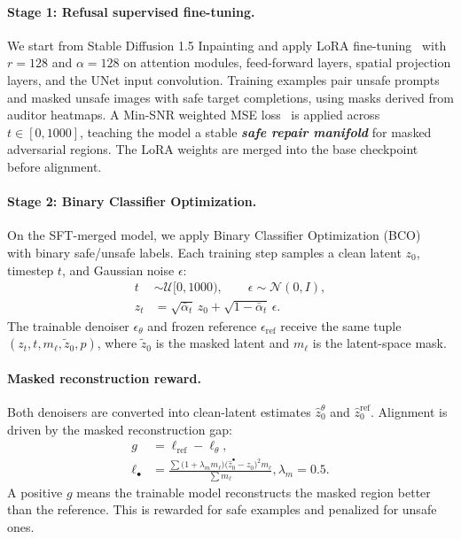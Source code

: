 \documentclass[11pt]{article}
\begin{document}
\paragraph{Stage 1: Refusal supervised fine-tuning.}
We start from Stable Diffusion 1.5 Inpainting and apply LoRA
fine-tuning~\cite{hu2022lora} with $r=128$ and $\alpha=128$ on attention
modules, feed-forward layers, spatial projection layers, and the UNet input
convolution. Training examples pair unsafe prompts and masked unsafe images
with safe target completions, using masks derived from auditor heatmaps. A
Min-SNR weighted MSE loss~\cite{hang2023minsnr} is applied across
$t\in[0,1000]$, teaching the model a stable \textbf{\emph{safe repair
manifold}} for masked adversarial regions. The LoRA weights are merged into
the base checkpoint before alignment.

\paragraph{Stage 2: Binary Classifier Optimization.}
On the SFT-merged model, we apply Binary Classifier Optimization
(BCO)~\cite{jung2024bco} with binary safe/unsafe labels. Each training step
samples a clean latent $z_0$, timestep $t$, and Gaussian noise $\epsilon$:
\begin{align*}
t &\sim \mathcal{U}[0,1000),
\qquad
\epsilon\sim\mathcal{N}(0,I),                                      \\[-0.1em]
z_t
&=
\sqrt{\bar\alpha_t}\,z_0
+
\sqrt{1-\bar\alpha_t}\,\epsilon .
\end{align*}
The trainable denoiser $\epsilon_\theta$ and frozen reference
$\epsilon_{\mathrm{ref}}$ receive the same tuple
$(z_t,t,m_\ell,\tilde z_0,p)$, where $\tilde z_0$ is the masked latent and
$m_\ell$ is the latent-space mask.

\paragraph{Masked reconstruction reward.}
Both denoisers are converted into clean-latent estimates
$\hat z^\theta_0$ and $\hat z^{\mathrm{ref}}_0$. Alignment is driven by the
masked reconstruction gap:
\begin{align*}
g
&=
\ell_{\mathrm{ref}}-\ell_{\theta},\\
\ell_{\bullet}
&=
\frac{
\sum
\bigl(1+\lambda_m m_\ell\bigr)
\bigl(\hat z^{\bullet}_0-z_0\bigr)^2m_\ell}{\sum m_\ell}, 
\lambda_m=0.5 .
\end{align*}
A positive $g$ means the trainable model reconstructs the masked region better
than the reference. This is rewarded for safe examples and penalized for
unsafe ones.
\end{document}

